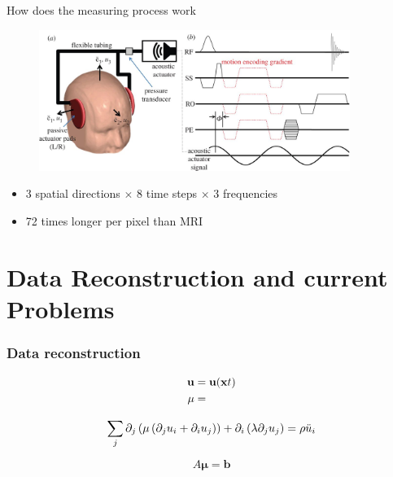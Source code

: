\begin{frame}{How does the measuring process work}

\begin{figure}
\includegraphics[width=0.9\textwidth]{Images/experiment.jpg}
\centering\end{figure}

\begin{itemize}
 \item<2-> 3 spatial directions $\times$ 8 time steps $\times$ 3 frequencies
 \item<3-> 72 times longer per pixel than MRI 
\end{itemize}

\end{frame}

\section{Data Reconstruction and current Problems}


\begin{frame}		\frametitle{Data reconstruction}


\begin{align}
 \mathbf{u} &= \mathbf{u}(\xb,t) \\
 \mu &=
\end{align}


\begin{equation}
 \sum_ j \partial_j \kl{ \mu \kl{ \partial_j u_i + \partial_i u_j}} + \partial_i \kl{\lambda \partial_j u_j} = \rho \ddot{u}_i
\end{equation}

\begin{equation}
 A\mathbf{\mu} = \mathbf{b}
\end{equation}


\end{frame}

